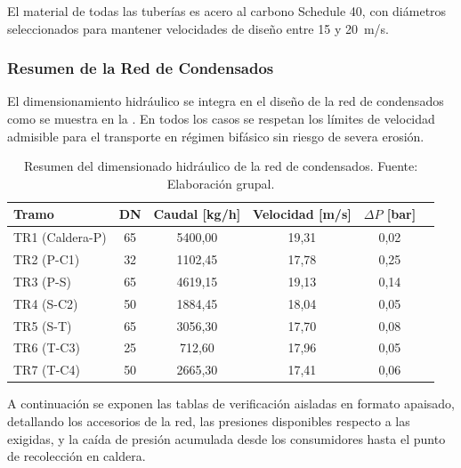 \documentclass[12pt]{article}
\begin{document}
El material de todas las tuberías es acero al carbono Schedule 40, con diámetros seleccionados para mantener velocidades de diseño entre 15 y 20~m/s.


\subsubsection{Resumen de la Red de Condensados}
\label{subsubsec:resumen-condensados}

El dimensionamiento hidráulico se integra en el diseño de la red de condensados como se muestra en la . En todos los casos se respetan los límites de velocidad admisible para el transporte en régimen bifásico sin riesgo de severa erosión.

\begin{table}[H]
	\centering
	\normalsize
	\caption{Resumen del dimensionado hidráulico de la red de condensados. Fuente: Elaboración grupal.}
	\label{tab:resumen-red-condensados}
	\begin{tabular}{lccccc}
		\toprule
		\textbf{Tramo}  & \textbf{DN} & \textbf{Caudal [kg/h]} & \textbf{Velocidad [m/s]} & \textbf{$\Delta P$ [bar]} \\
		\midrule
		TR1 (Caldera-P) & 65          & 5400,00                & 19,31                    & 0,02                      \\
		TR2 (P-C1)      & 32          & 1102,45                & 17,78                    & 0,25                      \\
		TR3 (P-S)       & 65          & 4619,15                & 19,13                    & 0,14                      \\
		TR4 (S-C2)   & 50          & 1884,45                & 18,04                    & 0,05                      \\
		TR5 (S-T)       & 65          & 3056,30                & 17,70                    & 0,08                      \\
		TR6 (T-C3)   & 25          & 712,60                 & 17,96                    & 0,05                      \\
		TR7 (T-C4)   & 50          & 2665,30                & 17,41                    & 0,06                      \\
		\bottomrule
	\end{tabular}
\end{table}


A continuación se exponen las tablas de verificación aisladas en formato apaisado, detallando los accesorios de la red, las presiones disponibles respecto a las exigidas, y la caída de presión acumulada desde los consumidores hasta el punto de recolección en caldera.
\end{document}
